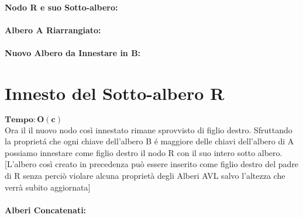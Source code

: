 \paragraph{ \newline \newline Nodo R e suo Sotto-albero: \newline \newline}
\begin{center}


\paragraph{ \newline \newline Albero A Riarrangiato: \newline \newline}


\paragraph{ Nuovo Albero da Innestare in B: \newline}




\section{Innesto del Sotto-albero R}
$\mathbf{Tempo: O(c)}$\\ 
Ora il il nuovo nodo così innestato rimane sprovvisto di figlio destro. Sfruttando la propriet\'a che ogni chiave dell'albero B \'e maggiore delle chiavi dell'albero di A possiamo innestare come figlio destro il nodo R con il suo intero sotto albero. 
[L'albero così creato in precedenza può essere inserito come figlio destro del padre di R senza perciò violare alcuna proprietà degli Alberi AVL salvo l'altezza che verrà subito aggiornata]

\paragraph{Alberi Concatenati:}





\end{center}
